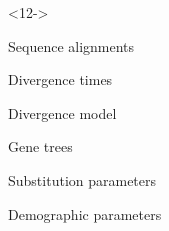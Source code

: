\begin{frame}[t]
\begin{columns}[c]
        \begin{onlyenv}<12->
            \begin{minipage}[c][0.5\textheight][c]{\linewidth}
                \begin{mydescription}
                    \item[\alignmentVector] Sequence alignments
                    \item[\divTimeMapVector] Divergence times
                    \item[\divModel{}] Divergence model
                    \item[\allParameters{}] Gene trees
                    \item[\ ] Substitution parameters
                    \item[\ ] Demographic parameters
                \end{mydescription}
            \end{minipage}
        \end{onlyenv}

\end{columns}
\end{frame}
